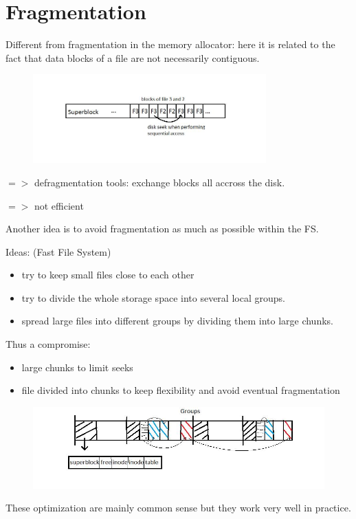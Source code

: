 \section{Fragmentation}

Different from fragmentation in the memory allocator: here it is related to the fact that data blocks of a file are not necessarily contiguous.

 \begin{figure}[h!]
  \begin{center}
    \includegraphics[width=0.8\textwidth]{fragmentation.jpg}
  \end{center}
\end{figure}

$=>$ defragmentation tools: exchange blocks all accross the disk.

$=>$ not efficient

Another idea is to avoid fragmentation as much as possible within the FS.

Ideas: (Fast File System)
\begin{itemize}
  \item  try to keep small files close to each other
  \item try to divide the whole storage space into several local groups.
  \item spread large files into different groups by dividing them into large chunks.
\end{itemize}

Thus a compromise:
\begin{itemize}
  \item large chunks to limit seeks
  \item file divided into chunks to keep flexibility and avoid eventual fragmentation
\end{itemize}
\begin{figure}[h!]
  \begin{center}
    \includegraphics[width=\textwidth]{fragmentation_2.jpg}
  \end{center}
\end{figure}
These optimization are mainly common sense but they work very well in practice.

